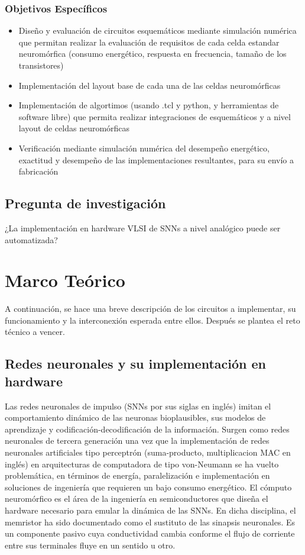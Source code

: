 \documentclass[letter, 12pt]{article}
\begin{document}
\subsubsection{Objetivos Específicos}
\begin{itemize}
    \item Diseño y evaluación de circuitos esquemáticos mediante simulación numérica que permitan realizar la evaluación de requisitos de cada celda estandar neuromórfica (consumo energético, respuesta en frecuencia, tamaño de los transistores)
    \item Implementación del layout base de cada una de las celdas neuromórficas
    \item Implementación de algortimos (usando .tcl y python, y herramientas de software libre) que permita realizar integraciones de esquemáticos y a nivel layout de celdas neuromórficas 
    \item Verificación mediante simulación numérica del desempeño energético, exactitud y desempeño de las implementaciones resultantes, para su envío a fabricación
\end{itemize}


\subsection{Pregunta de investigación}
¿La implementación en hardware VLSI de SNNs a nivel analógico puede ser automatizada?

\section{Marco Teórico}
A continuación, se hace una breve descripción de los circuitos a implementar, su funcionamiento y la interconexión esperada entre ellos. Después se plantea el reto técnico a vencer.
\subsection{Redes neuronales y su implementación en hardware}
Las redes neuronales de impulso (SNNs por sus siglas en inglés) imitan el comportamiento dinámico de las neuronas bioplausibles, sus modelos de aprendizaje y codificación-decodificación de la información. Surgen como redes neuronales de tercera generación una vez que la implementación de redes neuronales artificiales tipo perceptrón (suma-producto, multiplicacion MAC en inglés) en arquitecturas de computadora de tipo von-Neumann se ha vuelto problemática, en términos de energía, paralelización e implementación en soluciones de ingeniería que requieren un bajo consumo energético. El cómputo neuromórfico es el área de la ingeniería en semiconductores que diseña el hardware necesario para emular la dinámica de las SNNs. En dicha disciplina, el memristor ha sido documentado como el sustituto de las sinapsis neuronales. Es un componente pasivo cuya conductividad cambia conforme el flujo de corriente entre sus terminales fluye en un sentido u otro. 
\end{document}
